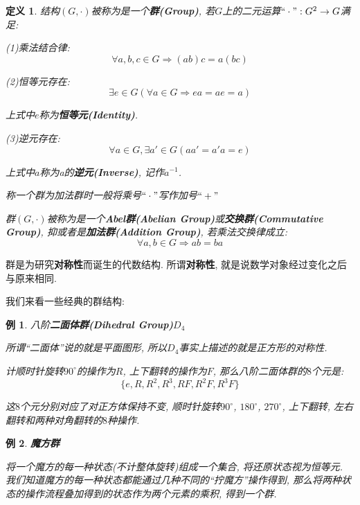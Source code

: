 \documentclass[UTF8]{ctexart}
\newcommand{\<}{\langle}
\renewcommand{\>}{\rangle}
\newtheorem{dfn}[thm]{定义}
\newtheorem{xmp}{例}[subsection]
\begin{document}
            \begin{dfn}
                结构$(G,\cdot)$被称为是一个\textbf{群(Group)}, 若$G$上的二元运算$``\cdot":G^2\to G$满足: 
                
                (1)乘法结合律: 
                \[\forall a,b,c\in G\Longrightarrow(ab)c = a(bc)\]
                
                (2)恒等元存在: 
                \[\exists e\in G(\forall a\in G\Longrightarrow ea=ae=a)\]
                
                上式中$e$称为\textbf{恒等元(Identity)}. 
                
                (3)逆元存在: 
                \[\forall a\in G, \exists a'\in G(aa'=a'a=e)\]
                
                上式中$a$称为a的\textbf{逆元(Inverse)}, 记作$a^{-1}$. 

                称一个群为加法群时一般将乘号$``\cdot"$写作加号$``+"$
                
                群$(G,\cdot)$被称为是一个\textbf{Abel群(Abelian Group)}或\textbf{交换群(Commutative Group)}, 抑或者是\textbf{加法群(Addition Group)}, 若乘法交换律成立: 
			    \[\forall a,b\in G\Longrightarrow ab=ba\]
            \end{dfn}

            群是为研究\textbf{对称性}而诞生的代数结构. 所谓\textbf{对称性}, 就是说数学对象经过变化之后与原来相同. 

            我们来看一些经典的群结构: 
            
            \begin{xmp}
                八阶\textbf{二面体群(Dihedral Group)}$D_4$

                所谓``二面体''说的就是平面图形, 所以$D_4$事实上描述的就是正方形的对称性. 

                计顺时针旋转$90^\circ$的操作为$R$, 上下翻转的操作为$F$, 那么八阶二面体群的$8$个元是: 
                \[\{e,R,R^2,R^3,RF,R^2F,R^3F\}\]

                这$8$个元分别对应了对正方体保持不变, 顺时针旋转$90^\circ$, $180^\circ$, $270^\circ$, 上下翻转, 左右翻转和两种对角翻转的$8$种操作. 
            \end{xmp}
            
            \begin{xmp}
                \textbf{魔方群}

                将一个魔方的每一种状态(不计整体旋转)组成一个集合, 将还原状态视为恒等元. 我们知道魔方的每一种状态都能通过几种不同的``拧魔方''操作得到, 那么将两种状态的操作流程叠加得到的状态作为两个元素的乘积, 得到一个群. 
            \end{xmp}
\end{document}
